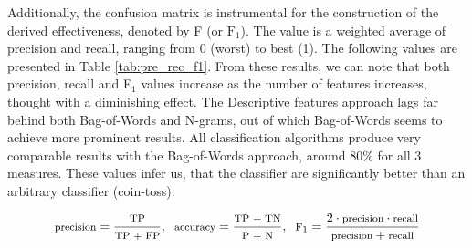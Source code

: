 		Additionally, the confusion matrix is instrumental for the construction of the derived effectiveness, denoted by F (or $ \text{F}_1 $). The value is a weighted average of precision and recall, ranging from 0 (worst) to best (1). The following values are presented in Table \ref{tab:pre_rec_f1}. From these results, we can note that both precision, recall and F$_1$ values increase as the number of features increases, thought with a diminishing effect. The Descriptive features approach lags far behind both Bag-of-Words and N-grams, out of which Bag-of-Words seems to achieve more prominent results. All classification algorithms produce very comparable results with the Bag-of-Words approach, around 80\% for all 3 measures. These values infer us, that the classifier are significantly better than an arbitrary classifier (coin-toss).
		
		\begin{equation}
			\footnotesize
				\text{precision} = \frac{\text{TP}}{\text{TP + FP}}, \ \
				\text{accuracy} = \frac{\text{TP + TN}}{\text{P + N}}, \ \
				\text{F}_1 = \frac{2 \cdot \text{precision} \cdot \text{recall}}{\text{precision} + \text{recall}}
		\label{precision}
		\end{equation}
		
